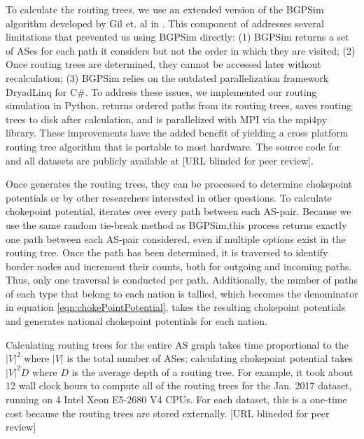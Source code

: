 \par To calculate the routing trees, we use an extended version of the
BGPSim algorithm developed by Gil et. al in \cite{quicksand}. This
component of \toolname{} addresses several limitations that prevented
us using BGPSim directly: (1) BGPSim returns a set of ASes for each
path it considers but not the order in which they are visited; (2)
Once routing trees are determined, they cannot be accessed later
without recalculation; (3) BGPSim relies on the outdated
parallelization framework DryadLinq for C\#. To address these issues,
we implemented our routing simulation in
Python. \toolname{} returns
ordered paths from its routing trees, saves routing trees to disk
after calculation, and is parallelized with MPI via the mpi4py
library. These improvements have the added benefit of yielding a cross
platform routing tree algorithm that is portable to most
hardware. The source code for \toolname{} and all datasets are publicly available at [URL blinded for peer review].


\par Once \toolname{} generates the routing trees, they can be processed to
determine chokepoint potentials or by other researchers interested in other questions. To calculate chokepoint potential, \toolname{} iterates over every path
between each AS-pair. Because we use the same random tie-break method as BGPSim,this process returns 
exactly one path between each AS-pair considered, even if multiple options exist in the
routing tree. Once the path has been determined, it is traversed to identify border nodes and increment their counts, both
for outgoing and incoming paths.  Thus, only one traversal is conducted
per path. Additionally, the number of paths of each type that belong to each
nation is tallied, which becomes the denominator in equation
\ref{eqn:chokePointPotential}.  \toolname{} takes the resulting chokepoint
potentials and generates national chokepoint potentials for each nation.

Calculating routing trees for the entire AS graph takes time proportional to the $|V|^2$ where $|V|$ is the total number of ASes; calculating chokepoint potential takes $|V|^2D$ where $D$ is the average depth of a routing tree. For example,
it took about 12 wall clock hours to compute all of the routing trees for the Jan. 2017 dataset, running on 4 Intel Xeon E5-2680 V4 CPUs.  For each dataset, this is a one-time cost because the routing trees are stored externally.  [URL blineded for peer review] 
